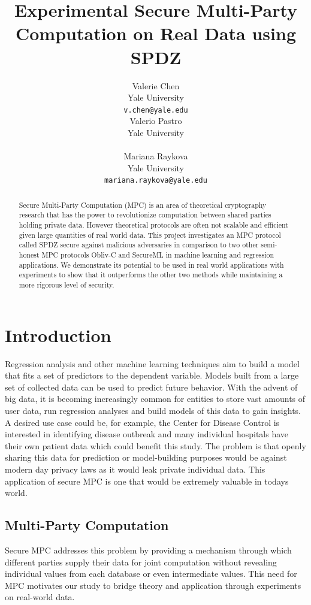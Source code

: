 \documentclass{article}
\title{Experimental Secure Multi-Party Computation on Real Data using SPDZ}
\author{
  Valerie Chen\\
  Yale University\\
  \texttt{v.chen@yale.edu} \\
  \And
  Valerio Pastro\\
  Yale University\\
  \textt{valerio.pastro@yale.edu}\\
  \And
  Mariana Raykova \\
  Yale University \\
  \texttt{mariana.raykova@yale.edu} \\
}
\begin{document}
\maketitle

\begin{abstract}
  Secure Multi-Party Computation (MPC) is an area of theoretical cryptography research that has the power to revolutionize computation between shared parties holding private data. However theoretical protocols are often not scalable and efficient given large quantities of real world data. This project investigates an MPC protocol called SPDZ secure against malicious adversaries in comparison to two other semi-honest MPC protocols Obliv-C and SecureML in machine learning and regression applications. We demonstrate its potential to be used in real world applications with experiments to show that it outperforms the other two methods while maintaining a more rigorous level of security.
\end{abstract}

\section{Introduction}

Regression analysis and other machine learning techniques aim to build a model that fits a set of predictors to the dependent variable. Models built from a large set of collected data can be used to predict future behavior. With the advent of big data, it is becoming increasingly common for entities to store vast amounts of user data, run regression analyses and build models of this data to gain insights. A desired use case could be, for example, the Center for Disease Control is interested in identifying disease outbreak and many individual hospitals have their own patient data which could benefit this study. The problem is that openly sharing this data for prediction or model-building purposes would be against modern day privacy laws as it would leak private individual data. This application of secure MPC is one that would be extremely valuable in today\textquotesingle s world.

\subsection{Multi-Party Computation}

Secure MPC addresses this problem by providing a mechanism through which different parties supply their data for joint computation without revealing individual values from each database or even intermediate values. This need for MPC motivates our study to bridge theory and application through experiments on real-world data. 
\end{document}
